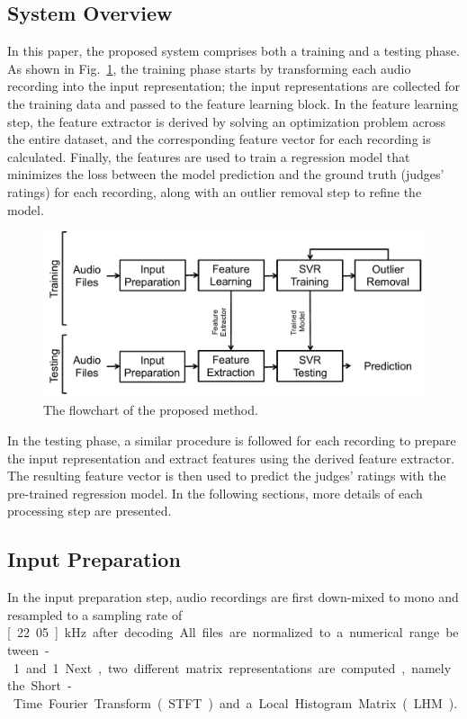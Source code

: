 \documentclass[conference]{IEEEtran}
\begin{document}
\subsection{System Overview}
In this paper, the proposed system comprises both a training and a testing phase. As shown in Fig.~\ref{fig:flowchart}, the training phase starts by transforming each audio recording into the input representation; the input representations are collected for the training data and passed to the feature learning block. In the feature learning step, the feature extractor is derived by solving an optimization problem across the entire dataset, and the corresponding feature vector for each recording is calculated. Finally, the features are used to train a regression model that minimizes the loss between the model prediction and the ground truth (judges' ratings) for each recording, along with an outlier removal step to refine the model. 

\begin{figure}
\centering
\includegraphics[width = 8 cm]{./figs/flowchart.pdf}
\caption{The flowchart of the proposed method.}
\label{fig:flowchart}
\end{figure}

In the testing phase, a similar procedure is followed for each recording to prepare the input representation and extract features using the derived feature extractor. The resulting feature vector is then used to predict the judges' ratings with the pre-trained regression model. In the following sections, more details of each processing step are presented. 

\subsection{Input Preparation}\label{subsec:input}
In the input preparation step, audio recordings are first down-mixed to mono and resampled to a sampling rate of \unit[22.05]{kHz} after decoding. All files are normalized to a numerical range between -1 and 1. Next, two different matrix representations are computed, namely the Short-Time Fourier Transform (STFT) and a Local Histogram Matrix (LHM). 
\end{document}
